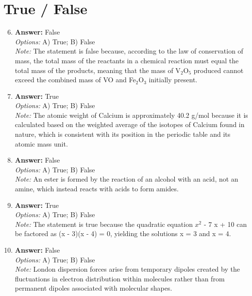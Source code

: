 \documentclass[12pt]{article}
\begin{document}
\section*{True / False}
\begin{enumerate}[label=\arabic*.]
\setcounter{enumi}{5}
\item \textbf{Answer:} False
\\ \textit{Options:} A) True; B) False
\\ \textit{Note:} The statement is false because, according to the law of conservation of mass, the total mass of the reactants in a chemical reaction must equal the total mass of the products, meaning that the mass of V$_{2}$O$_{5}$ produced cannot exceed the combined mass of VO and Fe$_{2}$O$_{3}$ initially present.
\item \textbf{Answer:} True
\\ \textit{Options:} A) True; B) False
\\ \textit{Note:} The atomic weight of Calcium is approximately 40.2 g/mol because it is calculated based on the weighted average of the isotopes of Calcium found in nature, which is consistent with its position in the periodic table and its atomic mass unit.
\item \textbf{Answer:} False
\\ \textit{Options:} A) True; B) False
\\ \textit{Note:} An ester is formed by the reaction of an alcohol with an acid, not an amine, which instead reacts with acids to form amides.
\item \textbf{Answer:} True
\\ \textit{Options:} A) True; B) False
\\ \textit{Note:} The statement is true because the quadratic equation $x^2$ - 7 x + 10 can be factored as (x - 3)(x - 4) = 0, yielding the solutions x = 3 and x = 4.
\item \textbf{Answer:} False
\\ \textit{Options:} A) True; B) False
\\ \textit{Note:} London dispersion forces arise from temporary dipoles created by the fluctuations in electron distribution within molecules rather than from permanent dipoles associated with molecular shapes.
\end{enumerate}
\end{document}
